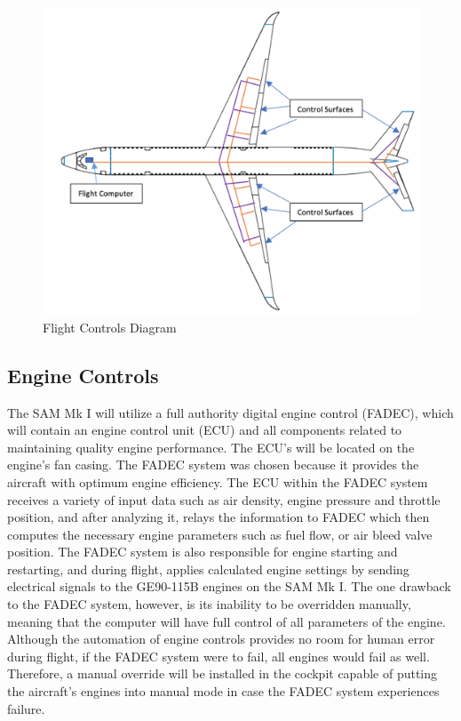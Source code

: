 \begin{figure}[H]
    \centering
    \includegraphics[width=.75\linewidth]{Photos/systems/flight_controls.png}
    \caption{Flight Controls Diagram}
    \label{flighte_controls}
\end{figure}

\subsection{Engine Controls}
The SAM Mk I will utilize a full authority digital engine control (FADEC), which will contain an engine control unit (ECU) and all components related to maintaining quality engine performance. The ECU's will be located on the engine's fan casing. The FADEC system was chosen because it provides the aircraft with optimum engine efficiency. The ECU within the FADEC system receives a variety of input data such as air density, engine pressure and throttle position, and after analyzing it, relays the information to FADEC which then computes the necessary engine parameters such as fuel flow, or air bleed valve position. The FADEC system is also responsible for engine starting and restarting, and during flight, applies calculated engine settings by sending electrical signals to the GE90-115B engines on the SAM Mk I. The one drawback to the FADEC system, however, is its inability to be overridden manually, meaning that the computer will have full control of all parameters of the engine. Although the automation of engine controls provides no room for human error during flight, if the FADEC system were to fail, all engines would fail as well. Therefore, a manual override will be installed in the cockpit capable of putting the aircraft's engines into manual mode in case the FADEC system experiences failure.  

